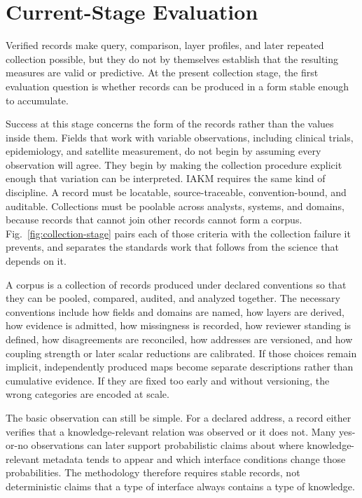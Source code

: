 \documentclass[preprints,article,submit,moreauthors]{Definitions/mdpi}
\begin{document}
\section{Current-Stage Evaluation}\label{sec:9}

Verified records make query, comparison, layer profiles, and later repeated collection possible, but they do not by themselves establish that the resulting measures are valid or predictive. At the present collection stage, the first evaluation question is whether records can be produced in a form stable enough to accumulate.

Success at this stage concerns the form of the records rather than the values inside them. Fields that work with variable observations, including clinical trials, epidemiology, and satellite measurement, do not begin by assuming every observation will agree. They begin by making the collection procedure explicit enough that variation can be interpreted. IAKM requires the same kind of discipline. A record must be locatable, source-traceable, convention-bound, and auditable. Collections must be poolable across analysts, systems, and domains, because records that cannot join other records cannot form a corpus. Fig.~\ref{fig:collection-stage} pairs each of those criteria with the collection failure it prevents, and separates the standards work that follows from the science that depends on it.

A corpus is a collection of records produced under declared conventions so that they can be pooled, compared, audited, and analyzed together. The necessary conventions include how fields and domains are named, how layers are derived, how evidence is admitted, how missingness is recorded, how reviewer standing is defined, how disagreements are reconciled, how addresses are versioned, and how coupling strength or later scalar reductions are calibrated. If those choices remain implicit, independently produced maps become separate descriptions rather than cumulative evidence. If they are fixed too early and without versioning, the wrong categories are encoded at scale.

The basic observation can still be simple. For a declared address, a record either verifies that a knowledge-relevant relation was observed or it does not. Many yes-or-no observations can later support probabilistic claims about where knowledge-relevant metadata tends to appear and which interface conditions change those probabilities. The methodology therefore requires stable records, not deterministic claims that a type of interface always contains a type of knowledge.
\end{document}
